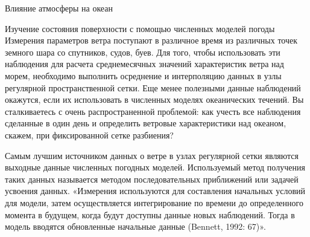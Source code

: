 \begin{chapter}{Влияние атмосферы на океан}
\begin{section}{Изучение состояния поверхности с помощью численных моделей погоды}
Измерения параметров ветра поступают в различное время из различных
точек земного шара со спутников, судов, буев. Для того, чтобы
использовать эти наблюдения для расчета среднемесячных значений
характеристик ветра над морем, необходимо выполнить осреднение и
интерполяцию данных в узлы регулярной пространственной сетки. Еще
менее полезными данные наблюдений окажутся, если их использовать в
численных моделях океанических течений. Вы сталкиваетесь с очень
распространенной проблемой: как учесть все наблюдения сделанные в один
день и определить ветровые характеристики над океаном, скажем, при
фиксированной сетке разбиения?
%

Самым лучшим источником данных о ветре в узлах регулярной сетки
являются выходные данные численных погодных моделей. Используемый
метод получения таких данных называется методом последовательных
приближений или задачей усвоения данных. «Измерения используются для
составления начальных условий для модели, затем осуществляется
интегрирование по времени до определенного момента в будущем, когда
будут доступны данные новых наблюдений. Тогда в модель вводятся
обновленные начальные данные (Bennett, 1992: 67)».
%


\end{section}
\end{chapter}
